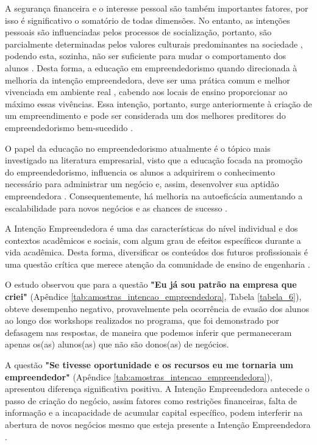 A segurança financeira e o interesse pessoal são também importantes fatores, por isso é significativo o somatório de todas dimensões. No entanto, as intenções pessoais são influenciadas pelos processos de socialização, portanto, são parcialmente determinadas pelos valores culturais predominantes na sociedade \cite{schwartz_les_2006}, podendo esta, sozinha, não ser suficiente para mudar o comportamento dos alunos \cite{adelaja_students_2018}. Desta forma, a educação em empreendedorismo quando direcionada à melhoria da intenção empreendedora, deve ser uma prática comum e melhor vivenciada em ambiente real \cite{damanpour_phases_2006}, cabendo aos locais de ensino proporcionar ao máximo essas vivências. Essa intenção, portanto, surge anteriormente à criação de um empreendimento e pode ser considerada um dos melhores preditores do empreendedorismo bem-sucedido \cite{ajzen_attitudes_1987,krueger_competing_2000,garcia-rodriguez_entrepreneurial_2017}.

O papel da educação no empreendedorismo atualmente é o tópico mais investigado na literatura empresarial, visto  que a educação focada na promoção do empreendedorismo, influencia os alunos a adquirirem o conhecimento necessário para administrar um negócio e, assim,  desenvolver sua aptidão empreendedora \cite{nowinski_impact_2019}. Consequentemente, há melhoria na autoeficácia \cite{egerova_does_2017} aumentando a escalabilidade para novos negócios e as chances de sucesso \cite{kolstad_education_2015}.

A Intenção Empreendedora é uma das características do nível individual e dos contextos acadêmicos e sociais, com algum grau de efeitos específicos durante a vida acadêmica. Desta forma, diversificar os conteúdos dos futuros profissionais é uma questão crítica que merece atenção da comunidade de ensino de engenharia \cite{gilmartin_entrepreneurial_2019}.

O estudo observou que para a questão \textbf{"Eu já sou patrão na empresa que criei"} (Apêndice \ref{tab:amostras_intencao_empreendedora}, Tabela \ref{tabela_6}), obteve desempenho negativo, provavelmente pela ocorrência de evasão dos alunos ao longo dos workshops realizados no programa, que foi demonstrado por defasagem nas respostas, de maneira que podemos inferir que permaneceram apenas os(as) alunos(as) que não são donos(as) de negócios. 

A questão \textbf{"Se tivesse oportunidade e os recursos eu me tornaria um empreendedor"} (Apêndice \ref{tab:amostras_intencao_empreendedora}), apresentou diferença significativa positiva. A Intenção Empreendedora antecede o passo de criação do negócio, assim fatores como restrições financeiras, falta de informação e a incapacidade de acumular capital específico, podem interferir na abertura de novos negócios mesmo que esteja presente a Intenção Empreendedora \cite{auguste_what_2016}.

